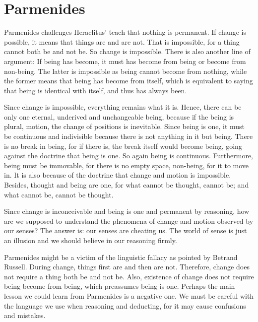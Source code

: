 \documentclass[11pt]{article}
\begin{document}
\begin{sloppypar}
\section{Parmenides}
Parmenides challenges Heraclitus’ teach that nothing is permanent. 
If change is possible, it means that things are and are not. 
That is impossible, for a thing cannot both be and not be. 
So change is impossible. 
There is also another line of argument: 
If being has become, it must has become from being or become from non-being. 
The latter is impossible as being cannot become from nothing, while the former means that being has become from itself, which is equivalent to saying that being is identical with itself, and thus has always been.

\par

Since change is impossible, everything remains what it is. 
Hence, there can be only one eternal, underived and unchangeable being, because if the being is plural, motion, the change of positions is inevitable. 
Since being is one, it must be continuous and indivisible because there is not anything in it but being. 
There is no break in being, for if there is, the break itself would become being, going against the doctrine that being is one. 
So again being is continuous. 
Furthermore, being must be immovable, for there is no empty space, non-being, for it to move in. 
It is also because of the doctrine that change and motion is impossible. 
Besides, thought and being are one, for what cannot be thought, cannot be; and what cannot be, cannot be thought.

\par

Since change is inconceivable and being is one and permanent by reasoning, how are we supposed to understand the phenomena of change and motion observed by our senses? 
The answer is: 
our senses are cheating us. 
The world of sense is just an illusion and we should believe in our reasoning firmly.

\par

Parmenides might be a victim of the linguistic fallacy as pointed by Betrand Russell. 
During change, things first are and then are not. 
Therefore, change does not require a thing both be and not be. 
Also, existence of change does not require being become from being, which preassumes being is one. 
Perhaps the main lesson we could learn from Parmenides is a negative one. 
We must be careful with the language we use when reasoning and deducting, for it may cause confusions and mistakes. 


\end{sloppypar}
\end{document}
